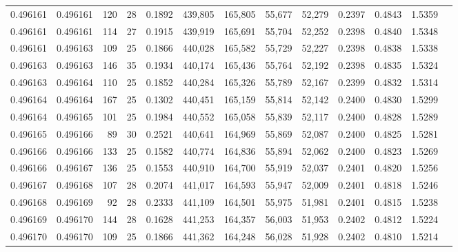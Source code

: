 \begin{tabular}{rrrrrrrrrrrrr}
0.496161 & 0.496161 & 120 &  28 &                                     0.1892 & 439,805 & 165,805 &  55,677 &  52,279 & 0.2397 & 0.4843 & 1.5359 \\
0.496161 & 0.496161 & 114 &  27 &                                     0.1915 & 439,919 & 165,691 &  55,704 &  52,252 & 0.2398 & 0.4840 & 1.5348 \\
0.496161 & 0.496163 & 109 &  25 &                                     0.1866 & 440,028 & 165,582 &  55,729 &  52,227 & 0.2398 & 0.4838 & 1.5338 \\
0.496163 & 0.496163 & 146 &  35 &                                     0.1934 & 440,174 & 165,436 &  55,764 &  52,192 & 0.2398 & 0.4835 & 1.5324 \\
0.496163 & 0.496164 & 110 &  25 &                                     0.1852 & 440,284 & 165,326 &  55,789 &  52,167 & 0.2399 & 0.4832 & 1.5314 \\
0.496164 & 0.496164 & 167 &  25 &                                     0.1302 & 440,451 & 165,159 &  55,814 &  52,142 & 0.2400 & 0.4830 & 1.5299 \\
0.496164 & 0.496165 & 101 &  25 &                                     0.1984 & 440,552 & 165,058 &  55,839 &  52,117 & 0.2400 & 0.4828 & 1.5289 \\
0.496165 & 0.496166 &  89 &  30 &                                     0.2521 & 440,641 & 164,969 &  55,869 &  52,087 & 0.2400 & 0.4825 & 1.5281 \\
0.496166 & 0.496166 & 133 &  25 &                                     0.1582 & 440,774 & 164,836 &  55,894 &  52,062 & 0.2400 & 0.4823 & 1.5269 \\
0.496166 & 0.496167 & 136 &  25 &                                     0.1553 & 440,910 & 164,700 &  55,919 &  52,037 & 0.2401 & 0.4820 & 1.5256 \\
0.496167 & 0.496168 & 107 &  28 &                                     0.2074 & 441,017 & 164,593 &  55,947 &  52,009 & 0.2401 & 0.4818 & 1.5246 \\
0.496168 & 0.496169 &  92 &  28 &                                     0.2333 & 441,109 & 164,501 &  55,975 &  51,981 & 0.2401 & 0.4815 & 1.5238 \\
0.496169 & 0.496170 & 144 &  28 &                                     0.1628 & 441,253 & 164,357 &  56,003 &  51,953 & 0.2402 & 0.4812 & 1.5224 \\
0.496170 & 0.496170 & 109 &  25 &                                     0.1866 & 441,362 & 164,248 &  56,028 &  51,928 & 0.2402 & 0.4810 & 1.5214 \\

\end{tabular}
